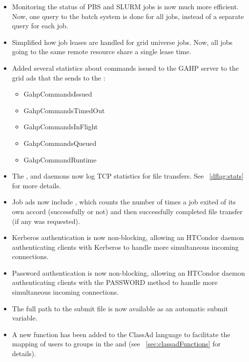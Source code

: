 \begin{itemize}
\item Monitoring the status of PBS and SLURM jobs is now much more efficient.
Now, one query to the batch system is done for all jobs, instead of a
separate query for each job.

\item Simplified how job leases are handled for grid universe jobs.
Now, all jobs going to the same remote resource share a single lease
time.

\item Added several statistics about commands issued to the GAHP server
to the grid ads that the  sends to the :
  \begin{itemize}
  \item GahpCommandsIssued
  \item GahpCommandsTimedOut
  \item GahpCommandsInFlight
  \item GahpCommandsQueued
  \item GahpCommandRuntime
  \end{itemize}

\item The ,  and  daemons
now log TCP statistics for file transfers.  See ~\ref{dflag:stats} for
more details.

\item Job ads now include , which counts the
number of times a job exited of its own accord (successfully or not) and
then successfully completed file transfer (if any was requested).

\item Kerberos authentication is now non-blocking, allowing an HTCondor
daemon authenticating clients with Kerberos to handle more simultaneous
incoming connections.

\item Password authentication is now non-blocking, allowing an HTCondor
daemon authenticating clients with the PASSWORD method to handle more
simultaneous incoming connections.

\item The full path to the submit file is now available as an automatic
submit variable.

\item A new function  has been added to the ClassAd language
to facilitate the mapping of users to groups in the  and
 (see ~\ref{sec:classadFunctions} for details).


\end{itemize}
